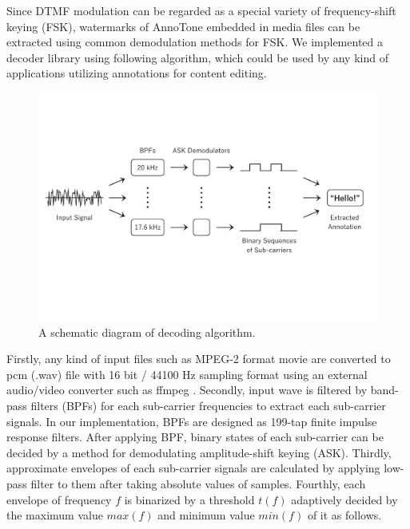 Since DTMF modulation can be regarded as a special variety of frequency-shift keying (FSK), watermarks of AnnoTone embedded in media files can be extracted using common demodulation methods for FSK.
We implemented a decoder library using following algorithm, which could be used by any kind of applications utilizing annotations for content editing.

\begin{figure}[htbp]
 \begin{center}
  \vspace{5mm}
  \includegraphics[width=140mm]{implementation_decode.pdf}
 \end{center}
 \caption{A schematic diagram of decoding algorithm.}
 \label{fig:impl_decd}
\end{figure}

Firstly, any kind of input files such as MPEG-2 format movie are converted to pcm (.wav) file with 16 bit / 44100 Hz sampling format using an external audio/video converter such as ffmpeg \cite{ffmpeg}.
Secondly, input wave is filtered by band-pass filters (BPFs) for each sub-carrier frequencies to extract each sub-carrier signals.
In our implementation, BPFs are designed as 199-tap finite impulse response filters.
After applying BPF, binary states of each sub-carrier can be decided by a method for demodulating amplitude-shift keying (ASK).
Thirdly, approximate envelopes of each sub-carrier signals are calculated by applying low-pass filter to them after taking absolute values of samples.
Fourthly, each envelope of frequency $f$ is binarized by a threshold $t(f)$ adaptively decided by the maximum value $max(f)$ and minimum value $min(f)$ of it as follows.

